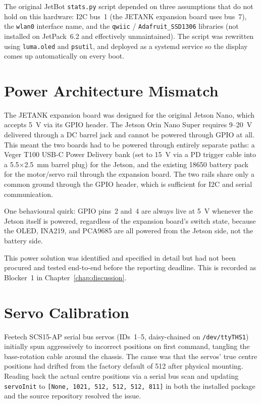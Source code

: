 \documentclass{imc-inf}
\begin{document}
The original JetBot \texttt{stats.py} script depended on three assumptions that do
not hold on this hardware: I2C bus~1 (the JETANK expansion board uses bus~7),
the \texttt{wlan0} interface name, and the \texttt{qwiic} / \texttt{Adafruit\_SSD1306}
libraries (not installed on JetPack~6.2 and effectively unmaintained). The script
was rewritten using \texttt{luma.oled} and \texttt{psutil}, and deployed as a
systemd service so the display comes up automatically on every boot.

\section{Power Architecture Mismatch}
\label{sec:power-architecture}

The JETANK expansion board was designed for the original Jetson Nano, which accepts
5~V via its GPIO header. The Jetson Orin Nano Super requires 9--20~V delivered
through a DC barrel jack and cannot be powered through GPIO at all. This meant the
two boards had to be powered through entirely separate paths: a Veger T100 USB-C
Power Delivery bank (set to 15~V via a PD trigger cable into a 5.5$\times$2.5~mm
barrel plug) for the Jetson, and the existing 18650 battery pack for the motor/servo
rail through the expansion board. The two rails share only a common ground through
the GPIO header, which is sufficient for I2C and serial communication.

One behavioural quirk: GPIO pins~2 and~4 are always live at 5~V whenever the Jetson
itself is powered, regardless of the expansion board's switch state, because the
OLED, INA219, and PCA9685 are all powered from the Jetson side, not the battery
side.

This power solution was identified and specified in detail but had not been procured
and tested end-to-end before the reporting deadline. This is recorded as Blocker~1
in Chapter~\ref{chap:discussion}.

\section{Servo Calibration}
\label{sec:servo-calibration}

Feetech SCS15-AP serial bus servos (IDs~1--5, daisy-chained on
\texttt{/dev/ttyTHS1}) initially spun aggressively to incorrect positions
on first command, tangling the base-rotation cable around the chassis.
The cause was that the servos' true centre positions had drifted from the factory
default of 512 after physical mounting. Reading back the actual centre positions
via a serial bus scan and updating \texttt{servoInit} to
\texttt{[None, 1021, 512, 512, 512, 811]} in both the installed package
and the source repository resolved the issue.
\end{document}
